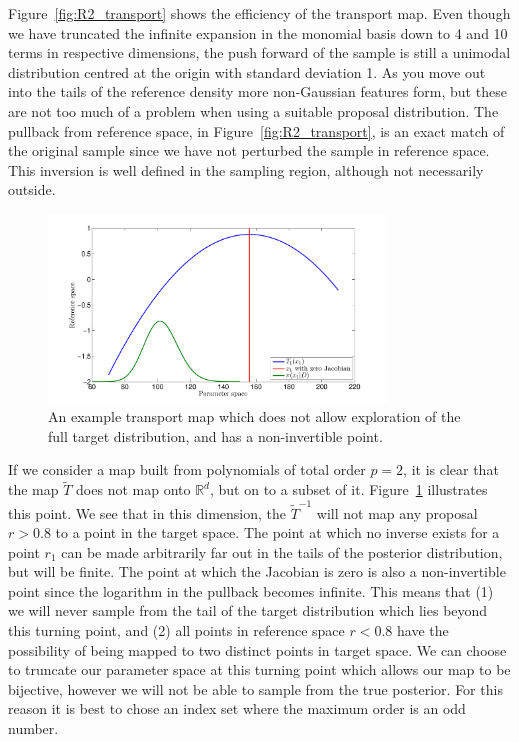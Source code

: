 \documentclass[final]{siamltex}
\begin{document}
Figure~\ref{fig:R2_transport} shows the efficiency of the transport map. Even though we have truncated the infinite expansion in the monomial basis down to 4 and 10 terms in respective dimensions, the push forward of the sample is still a unimodal distribution centred at the origin with standard deviation 1. As you move out into the tails of the reference density more non-Gaussian features form, but these are not too much of a problem when using a suitable proposal distribution. The pullback from reference space, in Figure~\ref{fig:R2_transport}, is an exact match of the original sample since we have not perturbed the sample in reference space. This inversion is well defined in the sampling region, although not necessarily outside.

\begin{figure}[!h]
\centering
\includegraphics[width=0.8\textwidth]{images/zero_jacobian}
\caption{An example transport map which does not allow exploration of the full target distribution, and has a non-invertible point.}
\label{fig:TM_zero_jacobian}
\end{figure}

If we consider a map built from polynomials of total order $p=2$, it is clear that the map $\tilde{T}$ does not map onto $\mathbb{R}^d$, but on to a subset of it. Figure~\ref{fig:TM_zero_jacobian} illustrates this point. We see that in this dimension, the $\tilde{T}^{-1}$ will not map any proposal $r > 0.8$ to a point in the target space. The point at which no inverse exists for a point $r_1$ can be made arbitrarily far out in the tails of the posterior distribution, but will be finite. The point at which the Jacobian is zero is also a non-invertible point since the logarithm in the pullback becomes infinite. This means that (1) we will never sample from the tail of the target distribution which lies beyond this turning point, and (2) all points in reference space $r < 0.8$ have the possibility of being mapped to two distinct points in target space. We can choose to truncate our parameter space at this turning point which allows our map to be bijective, however we will not be able to sample from the true posterior. For this reason it is best to chose an index set where the maximum order is an odd number.
\end{document}
